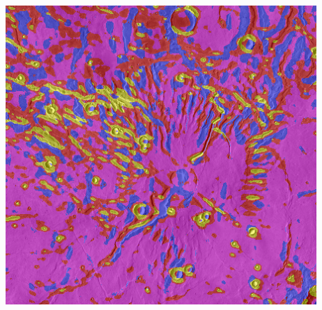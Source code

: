 \begin{table}[h!]
\begin{tabularx}{\textwidth}
		\includegraphics[width=.9\linewidth]{images/gen/filterbanks/Gre13_03.jpg_MR.png} \\
		

\end{tabularx}
\end{table}
